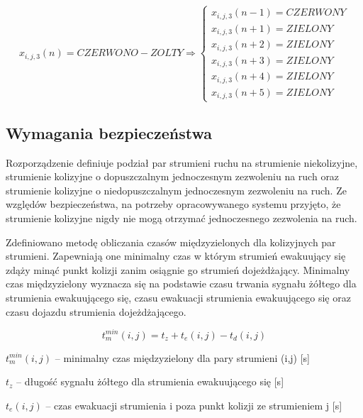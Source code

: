 \begin{equation}
	\label{formalne:czerwono_zolty}
	x_{i, j, 3} (n) = CZERWONO-ZOLTY \Longrightarrow \left\{
	\begin{array}{c}
		x_{i, j, 3} (n-1) = CZERWONY\\
		x_{i, j, 3} (n+1) = ZIELONY\\
		x_{i, j, 3} (n+2) = ZIELONY\\
		x_{i, j, 3} (n+3) = ZIELONY\\
		x_{i, j, 3} (n+4) = ZIELONY\\
		x_{i, j, 3} (n+5) = ZIELONY
	\end{array}
\end{equation}

\subsection{Wymagania bezpieczeństwa}
Rozporządzenie definiuje podział par strumieni ruchu na strumienie niekolizyjne, strumienie kolizyjne o dopuszczalnym jednoczesnym zezwoleniu na ruch oraz strumienie kolizyjne o niedopuszczalnym jednoczesnym zezwoleniu na ruch. Ze względów bezpieczeństwa, na potrzeby opracowywanego systemu przyjęto, że strumienie kolizyjne nigdy nie mogą otrzymać jednoczesnego zezwolenia na ruch.

Zdefiniowano metodę obliczania czasów międzyzielonych dla kolizyjnych par strumieni. Zapewniają one minimalny czas w którym strumień ewakuujący się zdąży minąć punkt kolizji zanim osiągnie go strumień dojeżdżający. Minimalny czas międzyzielony wyznacza się na podstawie czasu trwania sygnału żółtego dla strumienia ewakuującego się, czasu ewakuacji strumienia ewakuującego się oraz czasu dojazdu strumienia dojeżdżającego.

\begin{equation}
	t^{min}_{m} (i,j) = t_{z} + t_{e} (i,j) - t_{d} (i,j)
\end{equation}

\begin{math} t^{min}_{m} (i,j) \end{math} \textrm{ -- minimalny czas międzyzielony dla pary strumieni (i,j) [s]}

\begin{math} t_{z} \end{math} \textrm{ -- długość sygnału żółtego dla strumienia ewakuującego się [s]}

\begin{math} t_{e} (i,j) \end{math} \textrm{ -- czas ewakuacji strumienia i poza punkt kolizji ze strumieniem j [s]}


